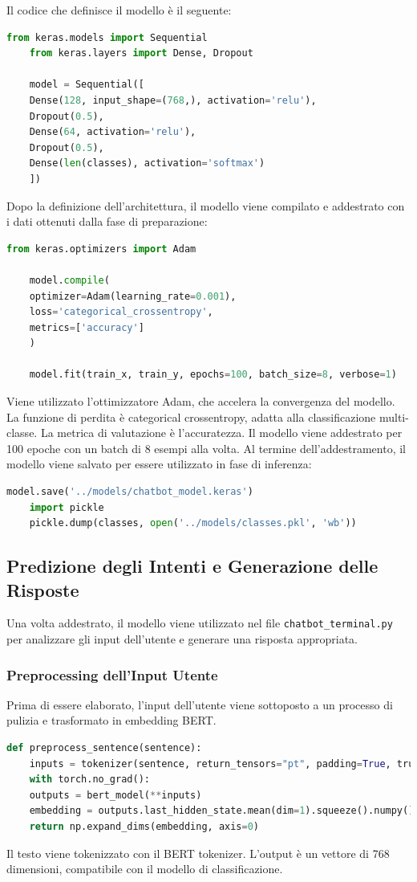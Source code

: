 \documentclass[12pt, letterpaper]{article}
\begin{document}
Il codice che definisce il modello è il seguente:

\begin{lstlisting}[language=Python]
	from keras.models import Sequential
	from keras.layers import Dense, Dropout
	
	model = Sequential([
	Dense(128, input_shape=(768,), activation='relu'),
	Dropout(0.5),
	Dense(64, activation='relu'),
	Dropout(0.5),
	Dense(len(classes), activation='softmax')
	])
\end{lstlisting}

Dopo la definizione dell'architettura, il modello viene compilato e addestrato con i dati ottenuti dalla fase di preparazione:

\begin{lstlisting}[language=Python]
	from keras.optimizers import Adam
	
	model.compile(
	optimizer=Adam(learning_rate=0.001),
	loss='categorical_crossentropy',
	metrics=['accuracy']
	)
	
	model.fit(train_x, train_y, epochs=100, batch_size=8, verbose=1)
\end{lstlisting}

Viene utilizzato l'ottimizzatore Adam, che accelera la convergenza del modello. La funzione di perdita è categorical crossentropy, adatta alla classificazione multi-classe. La metrica di valutazione è l'accuratezza. Il modello viene addestrato per 100 epoche con un batch di 8 esempi alla volta. Al termine dell'addestramento, il modello viene salvato per essere utilizzato in fase di inferenza:

\begin{lstlisting}[language=Python]
	model.save('../models/chatbot_model.keras')
	import pickle
	pickle.dump(classes, open('../models/classes.pkl', 'wb'))
\end{lstlisting}

\subsection{Predizione degli Intenti e Generazione delle Risposte}
Una volta addestrato, il modello viene utilizzato nel file \texttt{chatbot\_terminal.py} per analizzare gli input dell'utente e generare una risposta appropriata.

\subsubsection{Preprocessing dell'Input Utente}
Prima di essere elaborato, l'input dell'utente viene sottoposto a un processo di pulizia e trasformato in embedding BERT.
\begin{lstlisting}[language=Python]
	def preprocess_sentence(sentence):
	inputs = tokenizer(sentence, return_tensors="pt", padding=True, truncation=True, max_length=50)
	with torch.no_grad():
	outputs = bert_model(**inputs)
	embedding = outputs.last_hidden_state.mean(dim=1).squeeze().numpy()
	return np.expand_dims(embedding, axis=0)
\end{lstlisting}
Il testo viene tokenizzato con il BERT tokenizer. L'output è un vettore di 768 dimensioni, compatibile con il modello di classificazione.
\end{document}

